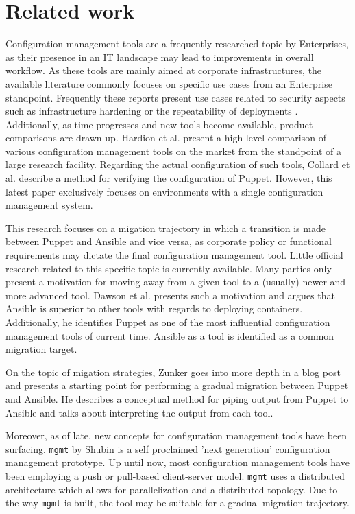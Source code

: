 \section{Related work}\label{sec:relatedwork}
Configuration management tools are a frequently researched topic by Enterprises, as their presence in an IT landscape  may lead to improvements in overall workflow. As these tools are mainly aimed at corporate infrastructures, the available literature commonly focuses on specific use cases from an Enterprise standpoint. Frequently these reports present use cases related to security aspects such as infrastructure hardening \cite{dotson2014security} or the repeatability of deployments \cite{ruiz2015reconstructable}. Additionally, as time progresses and new tools become available, product comparisons are drawn up. Hardion et al. \cite{Hardion2013} present a high level comparison of various configuration management tools on the market from the standpoint of a large research facility. Regarding the actual configuration of such tools, Collard et al. \cite{Collard2015} describe a method for verifying the configuration of Puppet. However, this latest paper exclusively focuses on environments with a single configuration management system. 

This research focuses on a migation trajectory in which a transition is made between Puppet and Ansible and vice versa, as corporate policy or functional requirements may dictate the final configuration management tool. Little official research related to this specific topic is currently available. Many parties only present a motivation for moving away from a given tool to a (usually) newer and more advanced tool. Dawson et al. \cite{dawson_hall_hecht_2014} presents such a motivation and argues that Ansible is superior to other tools with regards to deploying containers. Additionally, he identifies Puppet as one of the most influential configuration management tools of current time. Ansible as a tool is identified as a common migration target. 

On the topic of migation strategies, Zunker \cite{zunker_2014} goes into more depth in a blog post and presents a starting point for performing a gradual migration between Puppet and Ansible. He describes a conceptual method for piping output from Puppet to Ansible and talks about interpreting the output from each tool.

Moreover, as of late, new concepts for configuration management tools have been surfacing. \texttt{mgmt} by Shubin \cite{shubin2016} is a self proclaimed 'next generation' configuration management prototype.  Up until now, most configuration management tools have been employing a push or pull-based client-server model. \texttt{mgmt} uses a distributed architecture which allows for parallelization and a distributed topology. Due to the way \texttt{mgmt} is built, the tool may be suitable for a gradual migration trajectory.


